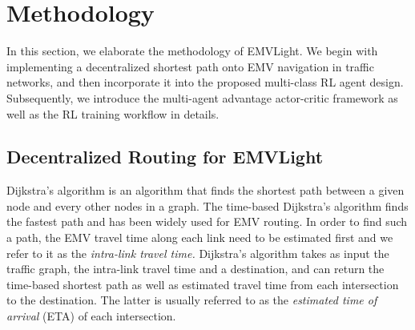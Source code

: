 \section{Methodology}\label{sec_methodology}
In this section, we elaborate the methodology of EMVLight. We begin with implementing a decentralized shortest path onto EMV navigation in traffic networks, and then incorporate it into the proposed multi-class RL agent design. Subsequently, we introduce the multi-agent advantage actor-critic framework as well as the RL training workflow in details.
\subsection{Decentralized Routing for EMVLight}
Dijkstra's algorithm is an algorithm that finds the shortest path between a given node and every other nodes in a graph. The time-based Dijkstra's algorithm finds the fastest path and has been widely used for EMV routing. In order to find such a path, the EMV travel time along each link need to be estimated first and we refer to it as the \emph{intra-link travel time.}
Dijkstra's algorithm takes as input the traffic graph, the intra-link travel time and a destination, and can return the time-based shortest path as well as estimated travel time from each intersection to the destination. The latter is usually referred to as the \emph{estimated time of arrival} (ETA) of each intersection. 




